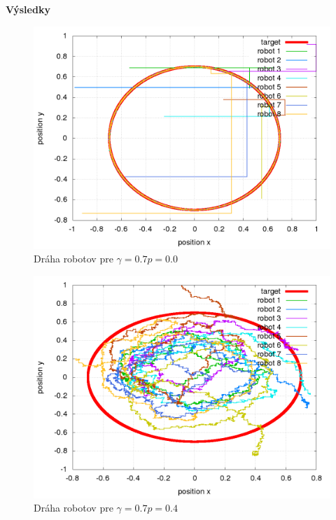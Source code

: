\documentclass[xcolor=dvipsnames]{beamer}
\begin{document}
\begin{frame}{\bf Výsledky}


  \begin{minipage}{.5\textwidth}

    \begin{figure}[!htb]
    \centering
    \includegraphics[scale=.2]{../../results_q_learning/nano_q_learning/result_00/robot_path.png}
    \caption{Dráha robotov pre $\gamma = 0.7 p = 0.0$}
    \label{img:nano_q_result_00_path}
    \end{figure}


  \end{minipage}%
  \begin{minipage}{.5\textwidth}

    \begin{figure}[!htb]
    \centering
    \includegraphics[scale=.2]{../../results_q_learning/nano_q_learning/result_04_02/robot_path.png}
    \caption{Dráha robotov pre $\gamma = 0.7 p = 0.4$}
    \label{img:nano_q_result_04_2_path}
    \end{figure}

  \end{minipage}

\end{frame}
\end{document}
